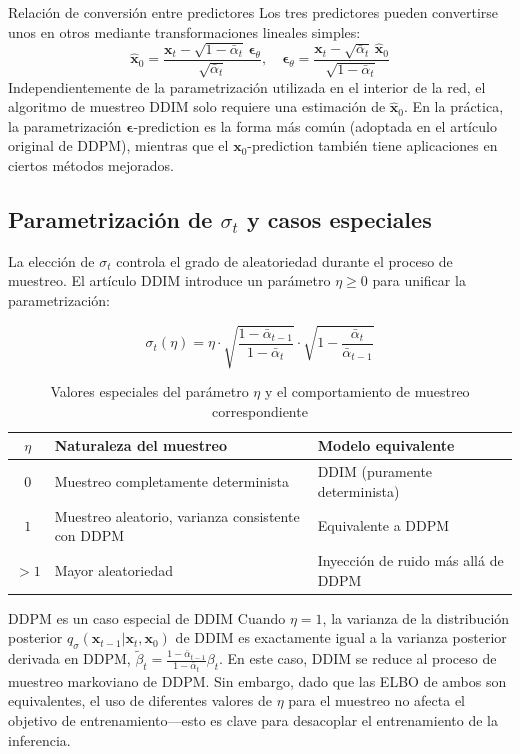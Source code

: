 \documentclass[a4paper]{article}
\begin{document}
\begin{knowledgebox}{Relación de conversión entre predictores}
Los tres predictores pueden convertirse unos en otros mediante transformaciones lineales simples:
$$
\hat{\mathbf{x}}_0 = \frac{\mathbf{x}_t - \sqrt{1-\bar{\alpha}_t}\,\boldsymbol{\epsilon}_\theta}{\sqrt{\bar{\alpha}_t}}, \quad
\boldsymbol{\epsilon}_\theta = \frac{\mathbf{x}_t - \sqrt{\bar{\alpha}_t}\,\hat{\mathbf{x}}_0}{\sqrt{1-\bar{\alpha}_t}}
$$
Independientemente de la parametrización utilizada en el interior de la red, el algoritmo de muestreo DDIM solo requiere una estimación de $\hat{\mathbf{x}}_0$. En la práctica, la parametrización $\boldsymbol{\epsilon}$-prediction es la forma más común (adoptada en el artículo original de DDPM), mientras que el $\mathbf{x}_0$-prediction también tiene aplicaciones en ciertos métodos mejorados.
\end{knowledgebox}

\subsection{Parametrización de $\sigma_t$ y casos especiales}

La elección de $\sigma_t$ controla el grado de aleatoriedad durante el proceso de muestreo. El artículo DDIM introduce un parámetro $\eta \geq 0$ para unificar la parametrización:

$$
\sigma_t(\eta) = \eta \cdot \sqrt{\frac{1-\bar{\alpha}_{t-1}}{1-\bar{\alpha}_t}} \cdot \sqrt{1 - \frac{\bar{\alpha}_t}{\bar{\alpha}_{t-1}}}
$$

\begin{table}[H]
\centering
\caption{Valores especiales del parámetro $\eta$ y el comportamiento de muestreo correspondiente}
\begin{tabular}{cll}
\toprule
$\eta$ & \textbf{Naturaleza del muestreo} & \textbf{Modelo equivalente} \\
\midrule
$0$ & Muestreo completamente determinista & DDIM (puramente determinista) \\
$1$ & Muestreo aleatorio, varianza consistente con DDPM & Equivalente a DDPM \\
$>1$ & Mayor aleatoriedad & Inyección de ruido más allá de DDPM \\
\bottomrule
\end{tabular}
\end{table}

\begin{warningbox}{DDPM es un caso especial de DDIM}
Cuando $\eta = 1$, la varianza de la distribución posterior $q_\sigma(\mathbf{x}_{t-1}|\mathbf{x}_t, \mathbf{x}_0)$ de DDIM es exactamente igual a la varianza posterior derivada en DDPM, $\tilde{\beta}_t = \frac{1-\bar{\alpha}_{t-1}}{1-\bar{\alpha}_t}\beta_t$. En este caso, DDIM se reduce al proceso de muestreo markoviano de DDPM. Sin embargo, dado que las ELBO de ambos son equivalentes, el uso de diferentes valores de $\eta$ para el muestreo no afecta el objetivo de entrenamiento—esto es clave para desacoplar el entrenamiento de la inferencia.
\end{warningbox}
\end{document}
